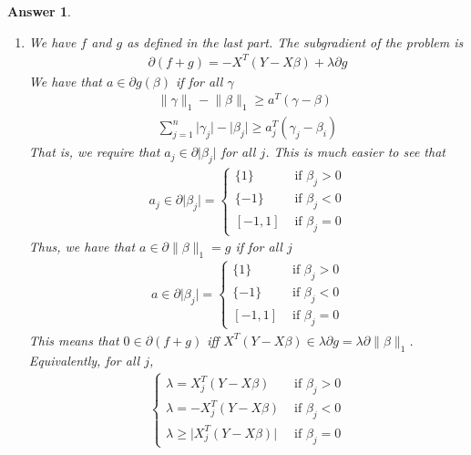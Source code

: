 \documentclass[12pt]{article}
\theoremstyle{colon}
\newtheorem*{answer}{Answer}
\begin{document}
\begin{answer}
\begin{enumerate}[label=\arabic*)]
    \item We have $f$ and $g$ as defined in the last part. The subgradient of the problem is
      \begin{gather*}
        \partial (f+g) = -X^T(Y - X \beta) + \lambda \partial g
      \end{gather*}
      We have that $a \in \partial g(\beta)$ if for all $\gamma$
      \begin{gather*}
        \lVert \gamma \rVert_1 - \lVert \beta \rVert_1 \geq a^T (\gamma - \beta) \\
        \sum_{j=1}^n \lvert \gamma_j \rvert - \lvert \beta_j \rvert \geq a_j^T (\gamma_j - \beta_i)
      \end{gather*}
      That is, we require that $a_j \in \partial \lvert \beta_j \rvert$ for all $j$. This is much easier to see that
      \begin{gather*}
        a_j \in \partial \lvert \beta_j \rvert = \begin{cases}
          \{1\} & \text{ if } \beta_j > 0 \\
          \{-1\} & \text{ if } \beta_j < 0 \\
          [-1,1] & \text{ if } \beta_j = 0
        \end{cases}
      \end{gather*}
      Thus, we have that $a \in \partial \lVert \beta \rVert_1 = g$ if for all $j$
      \begin{gather*}
        a \in \partial \lvert \beta_j \rvert = \begin{cases}
          \{1\} & \text{ if } \beta_j > 0 \\
          \{-1\} & \text{ if } \beta_j < 0 \\
          [-1,1] & \text{ if } \beta_j = 0
        \end{cases}
      \end{gather*}
      This means that $0 \in \partial (f+g)$ iff $X^T(Y - X \beta) \in \lambda \partial g = \lambda \partial \lVert \beta \rVert_1$. Equivalently, for all $j$,
      \begin{gather*}
        \begin{cases}
          \lambda = X_j^T(Y - X \beta) & \text{ if } \beta_j > 0 \\
          \lambda = -X_j^T(Y - X \beta) & \text{ if } \beta_j < 0 \\
          \lambda \geq \lvert X_j^T(Y - X \beta) \rvert & \text{ if } \beta_j = 0
        \end{cases}
      \end{gather*}


\end{enumerate}
\end{answer}
\end{document}
